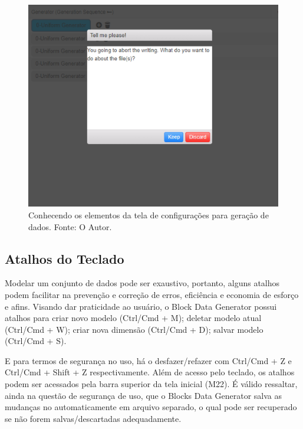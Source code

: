 \documentclass[
	12pt,				%
	openright,			%
	twoside,			%
	a4paper,			%
	english,			%
	brazil				%
	]{abntex2}
\begin{document}
			\begin{figure}[h]
				\centering
				\includegraphics[width=\linewidth]{./figures/prototipo/modal.png}
				\caption{Conhecendo os elementos da tela de configurações para geração de dados. Fonte: O Autor.}
				\label{fig:modal}
			\end{figure}
		\subsection{Atalhos do Teclado}
			Modelar um conjunto de dados pode ser exaustivo, portanto, alguns atalhos podem facilitar na prevenção e correção de erros, eficiência e economia de esforço e afins.
			Visando dar praticidade ao usuário, o Block Data Generator possui atalhos para 
				criar novo modelo (Ctrl/Cmd + M);
				deletar modelo atual (Ctrl/Cmd + W);
				criar nova dimensão (Ctrl/Cmd + D);
				salvar modelo (Ctrl/Cmd + S).
			\par
			E para termos de segurança no uso, há o desfazer/refazer com Ctrl/Cmd + Z e Ctrl/Cmd + Shift + Z respectivamente.
			Além de acesso pelo teclado, os atalhos podem ser acessados pela barra superior da tela inicial (M22).
			É válido ressaltar, ainda na questão de segurança de uso, que o Blocks Data Generator salva as mudanças no automaticamente em arquivo separado, o qual pode ser recuperado se não forem salvas/descartadas adequadamente. 

\end{document}
